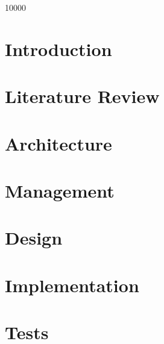 \documentclass[a4paper,oneside,openright,12pt]{report}
\begin{document}

\thispagestyle{empty} \normalfont 
\null \newpage

\thispagestyle{empty} \normalfont 
%

\thispagestyle{empty}  \cleardoublepage
{}
 10000
\raggedbottom
{\pagestyle{plain}
\tableofcontents
\cleardoublepage}
%



\chapter{Introduction}\label{ch:introduction}

\chapter{Literature Review}\label{ch:literature-review}






\chapter{Architecture}\label{ch:architecture}





\chapter{Management}\label{ch:management}





\chapter{Design}\label{ch:design}





\chapter{Implementation}\label{ch:implementation}


\chapter{Tests}\label{ch:tests}



\end{document}
